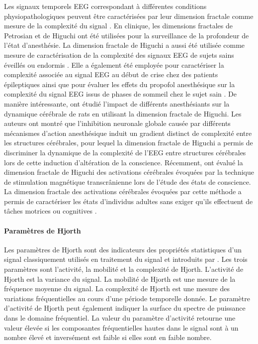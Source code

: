 Les signaux temporels EEG correspondant à différentes conditions physiopathologiques peuvent être caractérisées par leur dimension fractale comme mesure de la complexité du signal \citep{accardo1997use}. 
En clinique, les dimensions fractales de Petrosian \citep{hosseini2018computational} et de Higuchi \citep{anier2010entropy, anier2004higuchi} ont été utilisées pour la surveillance de la profondeur de l'état d'anesthésie. 
La dimension fractale de Higuchi a aussi été utilisée comme mesure de caractérisation de la complexité des signaux EEG de sujets sains éveillés ou endormis \citep{klonowski2002complexity}. 
Elle a également été employée pour caractériser la complexité associée au signal EEG au début de crise chez des patients épileptiques \citep{esteller1999fractal} ainsi que pour évaluer les effets du propofol anesthésique sur la complexité du signal EEG issus de phases de sommeil chez le sujet sain \citep{ferenets2006comparison}. 
De manière intéressante, \cite{spasic2011different} ont étudié l'impact de différents anesthésiants sur la dynamique cérébrale de rats en utilisant la dimension fractale de Higuchi. 
Les auteurs ont montré que l'inhibition neuronale globale causée par différents mécanismes d'action anesthésique induit un gradient distinct de complexité entre les structures cérébrales, pour lequel la dimension fractale de Higuchi a permis de discriminer la dynamique de la complexité de l'EEG entre structures cérébrales lors de cette induction d'altération de la conscience. 
Récemment, \cite{de2019fractal} ont évalué la dimension fractale de Higuchi des activations cérébrales évoquées par la technique de stimulation magnétique transcrânienne lors de l'étude des états de conscience. 
La dimension fractale des activations cérébrales évoquées par cette méthode a permis de caractériser les états d'individus adultes sans exiger qu'ils effectuent de tâches motrices ou cognitives \citep{de2019fractal}. 

\paragraph{Paramètres de Hjorth\\}
\label{hjorth}

Les paramètres de Hjorth sont des indicateurs des propriétés statistiques d'un signal classiquement utilisés en traitement du signal et introduits par \cite{hjorth1970eeg}. 
Les trois paramètres sont l'activité, la mobilité et la complexité de Hjorth. 
L'activité de Hjorth est la variance du signal. 
La mobilité de Hjorth est une mesure de la fréquence moyenne du signal. 
La complexité de Hjorth est une mesure des variations fréquentielles au cours d'une période temporelle donnée. 
Le paramètre d'activité de Hjorth peut également indiquer la surface du spectre de puissance dans le domaine fréquentiel. 
La valeur du paramètre d'activité retourne une valeur élevée si les composantes fréquentielles hautes dans le signal sont à un nombre élevé et inversément est faible si elles sont en faible nombre. 

